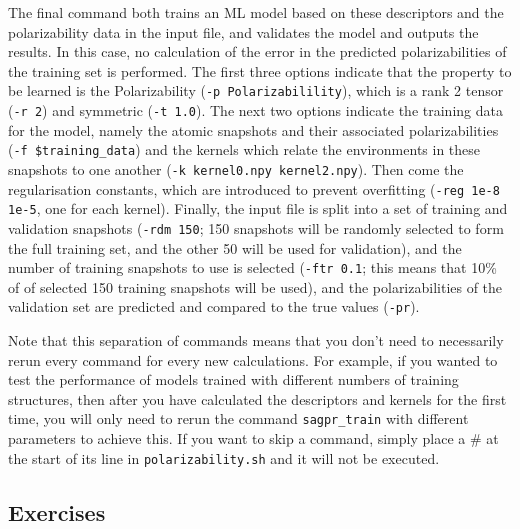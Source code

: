 \documentclass{article}
\begin{document}
The final command both trains an ML model based on these descriptors and the polarizability data in the input file, and validates the model and outputs the results. In this case, no calculation of the error in the predicted polarizabilities of the training set is performed. The first three options indicate that the property to be learned is the Polarizability (\verb|-p Polarizabilility|), which is a rank 2 tensor (\verb|-r 2|) and symmetric (\verb|-t 1.0|). The next two options indicate the training data for the model, namely the atomic snapshots and their associated polarizabilities (\verb|-f $training_data|) and the kernels which relate the environments in these snapshots to one another (\verb|-k kernel0.npy kernel2.npy|). Then come the regularisation constants, which are introduced to prevent overfitting (\verb|-reg 1e-8 1e-5|, one for each kernel). Finally, the input file is split into a set of training and validation snapshots (\verb|-rdm 150|; 150 snapshots will be randomly selected to form the full training set, and the other 50 will be used for validation), and the number of training snapshots to use is selected (\verb|-ftr 0.1|; this means that 10\% of of selected 150 training snapshots will be used), and the polarizabilities of the validation set are predicted and compared to the true values (\verb|-pr|).

Note that this separation of commands means that you don't need to necessarily rerun every command for every new calculations. For example, if you wanted to test the performance of models trained with different numbers of training structures, then after you have calculated the descriptors and kernels for the first time, you will only need to rerun the command \verb|sagpr_train| with different parameters to achieve this. If you want to skip a command, simply place a \# at the start of its line in \verb|polarizability.sh| and it will not be executed.

\subsection*{Exercises}
\end{document}
